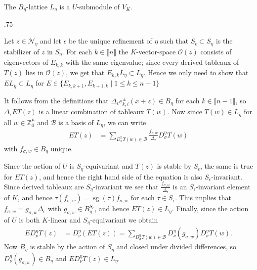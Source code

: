 \documentclass[11pt,fleqn]{article}
\makeatletter
\renewenvironment{proof}[1][\textit{Proof}]{\par
  \pushQED{\qed}%
  \normalfont \topsep.75\paraskip\relax
  \trivlist
  \item[\hskip\labelsep
        \itshape
    #1\@addpunct{.}]\ignorespaces
}{%
  \popQED\endtrivlist\@endpefalse
}
\newcommand\ZZ{\mathbb Z}
\newcommand\N{\mathcal N}
\renewcommand\O{\mathcal O}
\newcommand\interval[1]{\llbracket #1 \rrbracket}
\DeclareMathOperator\sg{sg}
\makeatother
\begin{document}
\begin{Theorem}
The $B_\eta$-lattice $L_\eta$ is a $U$-submodule of $V_K$.
\end{Theorem}
\begin{proof}
Let $z \in \N_\eta$ and let $\epsilon$ be the unique refinement of $\eta$ such 
that $S_\epsilon \subset S_\eta$ is the stabilizer of $z$ in $S_\eta$. For 
each $k \in \interval{n}$ the $K$-vector-space $\O(z)$ consists of 
eigenvectors of $E_{k,k}$ with the same eigenvalue; since every derived 
tableaux of $T(z)$ lies in $\O(z)$, we get that $E_{k,k} L_\eta \subset 
L_\eta$. Hence we only need to show that $E L_\eta \subset L_\eta$ for $E \in 
\{E_{k,k+1}, E_{k+1,k} \mid 1 \leq k \leq n-1\}$

It follows from the definitions that $\Delta_\epsilon e_{k,i}^\pm(x+z) \in 
B_\eta$ for each $k \in \interval{n-1}$, so $\Delta_\epsilon E T(z)$ is a 
linear combination of tableaux $T(w)$. Now since $T(w) \in L_\eta$ for all $w 
\in \ZZ^\mu_0$ and $\mathcal B$ is a basis of $L_\eta$, we can write
\begin{align*}
E T(z)
  &= \sum_{D_\sigma^\eta T(w) \in \mathcal B} 
    \frac{f_{\sigma,w}}{\Delta_\epsilon} D_\sigma^\eta T(w)
\end{align*}
with $f_{\sigma,w} \in B_\eta$ unique. 

Since the action of $U$ is $S_\eta$-equivariant and $T(z)$ is stable by
$S_\epsilon$, the same is true for $E T(z)$, and hence the right hand side of
the equation is also $S_\epsilon$-invariant. Since derived tableaux are 
$S_\eta$-invariant we see that $\frac{f_{\sigma,w}}{\Delta_\epsilon}$ is an
$S_\epsilon$-invariant element of $K$, and hence $\tau(f_{\sigma,w}) = 
\sg(\tau) f_{\sigma,w}$ for each $\tau \in S_\epsilon$. This implies that
$f_{\sigma,w} = g_{\sigma,w} \Delta_\epsilon$ with $g_{\sigma,w} \in 
B_\eta^{S_\epsilon}$, and hence $E T(z) \in L_\eta$. Finally, since the action
of $U$ is both $K$-linear and $S_\eta$-equivariant we obtain 
\begin{align*}
E D_\nu^\eta T(z)
  &= D_\nu^\eta (ET(z))
  = \sum_{D_\sigma^\eta T(w) \in \mathcal B} 
    D_\nu^\eta(g_{\sigma, w}) D_\sigma^\eta T(w).
\end{align*}
Now $B_\eta$ is stable by the action of $S_\eta$ and closed under divided 
differences, so $D_\nu^\eta(g_{\sigma, w}) \in B_\eta$ and $E D_\nu^\eta 
T(z) \in L_\eta$.
\end{proof}
\end{document}
